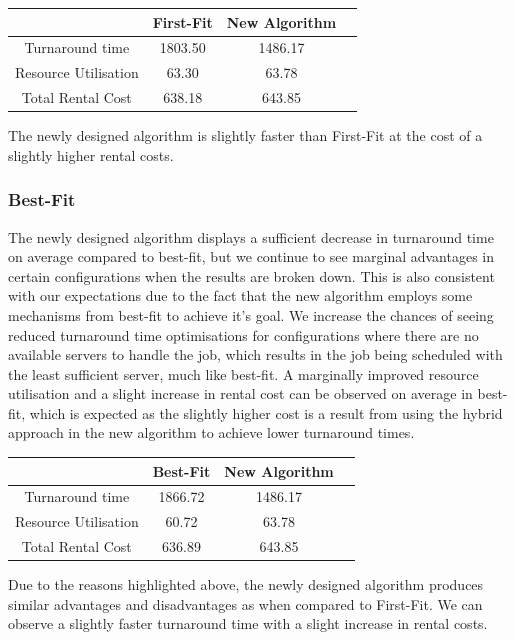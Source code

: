 \documentclass[a4paper]{article}
\begin{document}
\begin{center}
\begin{tabular}{|c|c|c|c|} 
 \hline
   & First-Fit & New Algorithm \\ [0.5ex] 
 \hline
 Turnaround time & 1803.50 & 1486.17 \\ 
 \hline
 Resource Utilisation & 63.30 & 63.78 \\
 \hline
 Total Rental Cost & 638.18 & 643.85 \\
 \hline
\end{tabular}
\end{center}

The newly designed algorithm is slightly faster than First-Fit at the cost of a slightly higher rental costs.

\subsubsection*{Best-Fit}
The newly designed algorithm displays a sufficient decrease in turnaround time on average compared to best-fit, but we continue to see marginal advantages in certain configurations when the results are broken down. This is also consistent with our expectations due to the fact that the new algorithm employs some mechanisms from best-fit to achieve it's goal. We increase the chances of seeing reduced turnaround time optimisations for configurations where there are no available servers to handle the job, which results in the job being scheduled with the least sufficient server, much like best-fit. A marginally improved resource utilisation and a slight increase in rental cost can be observed on average in best-fit, which is expected as the slightly higher cost is a result from using the hybrid approach in the new algorithm to achieve lower turnaround times.

\begin{center}
\begin{tabular}{|c|c|c|c|} 
 \hline
   & Best-Fit & New Algorithm \\ [0.5ex] 
 \hline
 Turnaround time & 1866.72 & 1486.17 \\ 
 \hline
 Resource Utilisation & 60.72 & 63.78 \\
 \hline
 Total Rental Cost & 636.89 & 643.85 \\
 \hline
\end{tabular}
\end{center}

Due to the reasons highlighted above, the newly designed algorithm produces similar advantages and disadvantages as when compared to First-Fit. We can observe a slightly faster turnaround time with a slight increase in rental costs.
\end{document}
